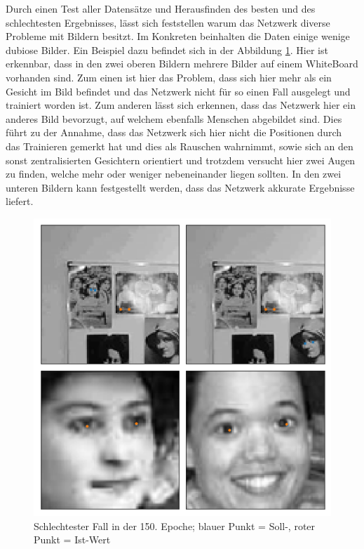 \noindent
Durch einen Test aller Datensätze und Herausfinden des besten und des schlechtesten Ergebnisses, lässt sich feststellen warum das Netzwerk diverse Probleme mit Bildern besitzt. 
Im Konkreten beinhalten die Daten einige wenige dubiose Bilder. 
Ein Beispiel dazu befindet sich in der Abbildung \ref{fig:dubio}. 
Hier ist erkennbar, dass in den zwei oberen Bildern mehrere Bilder auf einem WhiteBoard vorhanden sind. 
Zum einen ist hier das Problem, dass sich hier mehr als ein Gesicht im Bild befindet und das Netzwerk nicht für so einen Fall ausgelegt und trainiert worden ist. 
Zum anderen lässt sich erkennen, dass das Netzwerk hier ein anderes Bild bevorzugt, auf welchem ebenfalls Menschen abgebildet sind. 
Dies führt zu der Annahme, dass das Netzwerk sich hier nicht die Positionen durch das Trainieren gemerkt hat und dies als Rauschen wahrnimmt, sowie sich an den sonst zentralisierten Gesichtern orientiert und trotzdem versucht hier zwei Augen zu finden, welche mehr oder weniger nebeneinander liegen sollten. 
In den zwei unteren Bildern kann festgestellt werden, dass das Netzwerk akkurate Ergebnisse liefert. 
\begin{figure}[ht!]
	\centering
	\includegraphics[scale=0.6]{images/Bad_2.png}
	\caption{Schlechtester Fall in der 150. Epoche; blauer Punkt = Soll-, roter Punkt = Ist-Wert}
	\label{fig:dubio}
\end{figure} \phantom \newline

